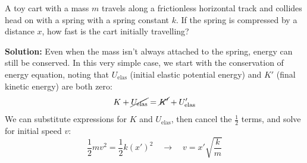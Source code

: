 \begin{example}
  A toy cart with a mass $m$
  travels along a frictionless horizontal track and collides head on with a
  spring with a spring constant $k$.
  If the spring is compressed by a distance $x$,
  how fast is the cart initially travelling?
  \begin{center}
  \end{center}
  \vspace{.2in}\textbf{Solution:} Even when the mass isn't always attached to
  the spring, energy can still be conserved. In this very simple case, we
  start with the conservation of energy equation, noting that $U_\text{elas}$
  (initial elastic potential energy) and $K'$ (final kinetic energy) are both
  zero:
  \begin{equation*}
    K+\cancel{U_\text{elas}}= \cancel{K'}+U_\text{elas}'
  \end{equation*}
  We can substitute expressions for $K$ and $U_\text{elas}$, then cancel the
  $\frac12$ terms, and solve for initial speed $v$:
  \begin{equation*}
    \frac12mv^2 = \frac12k(x')^2
    \quad\longrightarrow\quad
    v=x'\sqrt{\frac km}
  \end{equation*}
\end{example}




